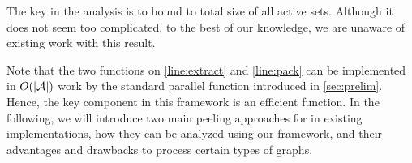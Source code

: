 The key in the analysis is to bound to total size of all active sets.
Although it does not seem too complicated, to the best of our knowledge, we are unaware of existing work with this result. 



Note that the two functions on \cref{line:extract} and \cref{line:pack} can be implemented in $O(|{\mathcal{A}}|)$ work by the standard parallel \pack{} function introduced in \cref{sec:prelim}. Hence, the key component in this framework is an efficient \FPeel{} function. 
In the following, we will introduce two main peeling approaches for in existing implementations, 
how they can be analyzed using our framework, and
their advantages and drawbacks to process certain types of graphs. 




